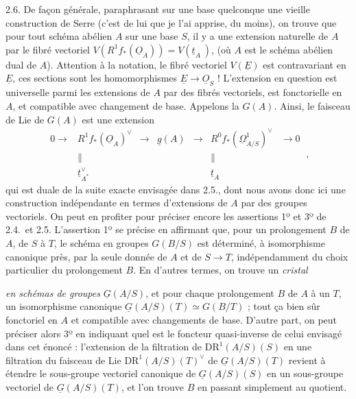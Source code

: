\documentclass[11pt,a4paper]{article}
\begin{document}
2.6. De façon générale, paraphrasant sur une base quelconque une vieille
construction de Serre (c'est de lui que je l'ai apprise, du moins), on trouve
que pour tout schéma abélien $A$ sur une base $S$, il y a une extension
naturelle de $A$ par le fibré vectoriel
$V(R^1f_*(\underline{O}_A))=V(\underline{t}_{A}\ )$, (où $A$ est le schéma
abélien dual de $A$). Attention à la notation, le fibré vectoriel
$V(\underline{E})$ est contravariant en $\underline{E}$, ces sections sont les
homomorphismes $\underline{E}\to\underline{O}_S$ ! L'extension en question est
universelle parmi les extensions de $A$ par des fibrés vectoriels, est
fonctorielle en $A$, et compatible avec changement de base. Appelons la
$G(A)$. Ainsi, le faisceau de Lie de $G(A)$ est une extension
\[
  \begin{array}{ccccccc}
  0\to & R^1f_*(\underline{O}_A)^{\vee} & \to & \underline{g}(A) & \to &
  R^0f_*(\underline{\Omega}^1_{A/S})^{\vee} & \to 0\\
  & \| & & & & \| & \\
  & \underline{t}^{\vee}_{A^*} & & & & \underline{t}_A &
  \end{array}\ ,
\]
qui est duale de la suite exacte envisagée dans 2.5., dont nous avons donc ici
une construction indépendante en termes d'extensions de $A$ par des groupes
vectoriels. On peut en profiter pour préciser encore les assertions 1º et 3º
de 2.4.\ et 2.5. L'assertion 1º se précise en affirmant que, pour un
prolongement $B$ de $A$, de $S$ à $T$, le schéma en groupes $G(B/S)$ est
déterminé, à isomorphisme canonique  près, par la
seule donnée de $A$ et de  $S\to T$, indépendamment du
choix particulier du prolongement $B$. En d'autres termes, on trouve un
\emph{cristal}

\emph{en schémas de groupes}  $\underline{G}(A/S)$, et pour chaque
prolongement  $B$ de $A$ à un $T$, un isomorphisme canonique
$\underline{G}(A/S)(T)\simeq G(B/T)$ ; tout ça bien sûr fonctoriel en $A$ et
compatible avec changements de base. D'autre part, on peut préciser alors 3º
en indiquant quel est le foncteur quasi-inverse de celui envisagé dans cet
énoncé : l'extension de la filtration de $\mathrm{DR}^1(A/S)(S)$ en une
filtration du faisceau de Lie $\mathrm{DR}^1(A/S)(T)^{\vee}$ de
$\underline{G}(A/S)(T)$ revient à étendre le sous-groupe vectoriel canonique de
$\underline{G}(A/S)(S)$ en un sous-groupe vectoriel de
$\underline{G}(A/S)(T)$, et l'on trouve $B$ en passant simplement au
quotient.
\end{document}
